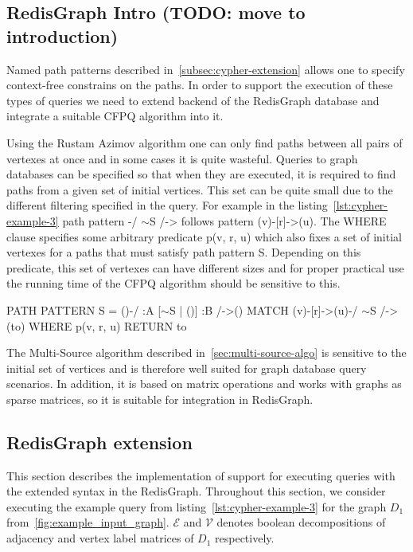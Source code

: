\subsection{RedisGraph Intro (TODO: move to introduction)}

Named path patterns described in~\autoref{subsec:cypher-extension} allows one to specify context-free constrains on the paths. In order to support the execution of these types of queries we need to extend backend of the RedisGraph database and integrate a suitable CFPQ algorithm into it. 

Using the Rustam Azimov algorithm one can only find paths between all pairs of vertexes at once and in some cases it is quite wasteful. Queries to graph databases can be specified so that when they are executed, it is required to find paths from a given set of initial vertices. This set can be quite small due to the different filtering specified in the query. For example in the listing~\ref{lst:cypher-example-3} path pattern \colorbox{blue!10}{-/ $\sim$S /->} follows pattern \colorbox{blue!10}{(v)-[r]->(u)}. The WHERE clause specifies some arbitrary predicate \colorbox{blue!10}{p(v, r, u)} which also fixes a set of initial vertexes for a paths that must satisfy path pattern \colorbox{blue!10}{S}. Depending on this predicate, this set of vertexes can have different sizes and for proper practical use the running time of the CFPQ algorithm should be sensitive to this.

\begin{algorithm}
\begin{algorithmic}[1]
\caption{...}
\label{lst:cypher-example-3}
\State PATH PATTERN S = ()-/ :A [$\sim$S | ()] :B /->()
\State MATCH (v)-[r]->(u)-/ $\sim$S /->(to)
\State WHERE p(v, r, u)
\State RETURN to
\end{algorithmic}
\end{algorithm}

The Multi-Source algorithm described in~\autoref{sec:multi-source-algo} is sensitive to the initial set of vertices and is therefore well suited for graph database query scenarios. In addition, it is based on matrix operations and works with graphs as sparse matrices, so it is suitable for integration in RedisGraph.

\subsection{RedisGraph extension}
This section describes the implementation of support for executing queries with the extended syntax in the RedisGraph. Throughout this section, we consider executing the example query from listing~\autoref{lst:cypher-example-3} for the graph $D_1$ from~\autoref{fig:example_input_graph}. $\mathcal{E}$ and $\mathcal{V}$ denotes boolean decompositions of adjacency and vertex label matrices of $D_1$ respectively. 

